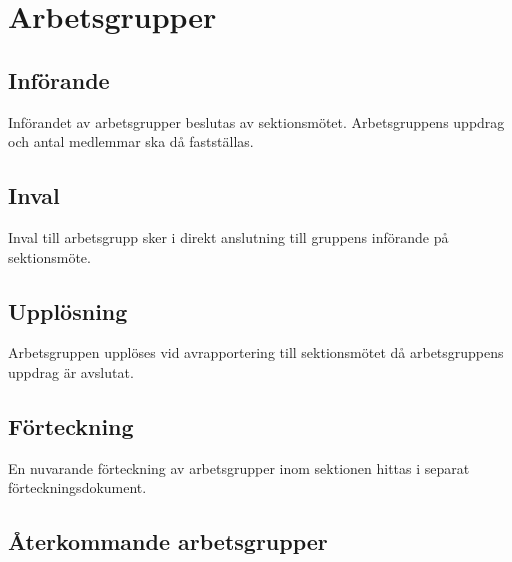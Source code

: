 \section{Arbetsgrupper}

\subsection{Införande}
Införandet av arbetsgrupper beslutas av sektionsmötet. Arbetsgruppens uppdrag och antal medlemmar ska då fastställas.

\subsection{Inval}
Inval till arbetsgrupp sker i direkt anslutning till gruppens införande på sektionsmöte.

\subsection{Upplösning}
Arbetsgruppen upplöses vid avrapportering till sektionsmötet då arbetsgruppens uppdrag är avslutat.

\subsection{Förteckning}
En nuvarande förteckning av arbetsgrupper inom sektionen hittas i separat förteckningsdokument.

\subsection{Återkommande arbetsgrupper}




